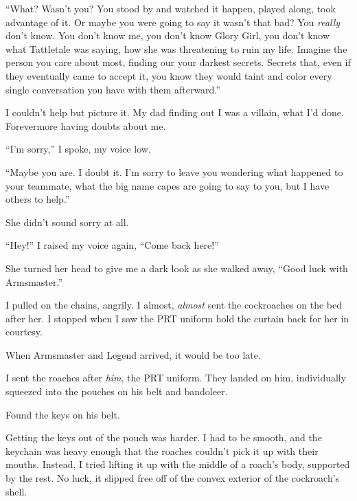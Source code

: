 ``What?  Wasn't you?  You stood by and watched it happen, played along, took advantage of it.  Or maybe you were going to say it wasn't that bad?  You \emph{really} don't know.  You don't know me, you don't know Glory Girl, you don't know what Tattletale was saying, how she was threatening to ruin my life.  Imagine the person you care about most, finding our your darkest secrets.  Secrets that, even if they eventually came to accept it, you know they would taint and color every single conversation you have with them afterward.''



I couldn't help but picture it.  My dad finding out I was a villain, what I'd done.  Forevermore having doubts about me.



``I'm sorry,'' I spoke, my voice low.



``Maybe you are.  I doubt it.  I'm sorry to leave you wondering what happened to your teammate, what the big name capes are going to say to you, but I have others to help.''



She didn't sound sorry at all.



``Hey!''  I raised my voice again, ``Come back here!''



She turned her head to give me a dark look as she walked away, ``Good luck with Armsmaster.''



I pulled on the chains, angrily.  I almost, \emph{almost} sent the cockroaches on the bed after her.  I stopped when I saw the PRT uniform hold the curtain back for her in courtesy.



When Armsmaster and Legend arrived, it would be too late.



I sent the roaches after \emph{him}, the PRT uniform.  They landed on him, individually squeezed into the pouches on his belt and bandoleer.



Found the keys on his belt.



Getting the keys out of the pouch was harder.  I had to be smooth, and the keychain was heavy enough that the roaches couldn't pick it up with their mouths.  Instead, I tried lifting it up with the middle of a roach's body, supported by the rest.  No luck, it slipped free off of the convex exterior of the cockroach's shell.



